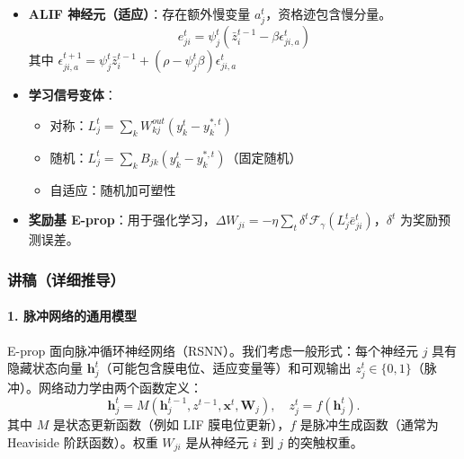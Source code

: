 \documentclass[journal,12pt,onecolumn]{IEEEtran}
\begin{document}
\begin{itemize}
\begin{equation}
        \end{equation}
    \item \textbf{ALIF 神经元（适应）}：存在额外慢变量 $a_j^t$，资格迹包含慢分量。
        \begin{equation}
            e_{ji}^t = \psi_j^t \left( \bar{z}_i^{t-1} - \beta \epsilon_{ji,a}^t \right)
        \end{equation}
        其中 $\epsilon_{ji,a}^{t+1} = \psi_j^t \bar{z}_i^{t-1} + (\rho - \psi_j^t\beta) \epsilon_{ji,a}^t$
    \item \textbf{学习信号变体}：
        \begin{itemize}
            \item 对称：$L_j^t = \sum_k W_{kj}^{out}(y_k^t - y_k^{*,t})$
            \item 随机：$L_j^t = \sum_k B_{jk}(y_k^t - y_k^{*,t})$（固定随机）
            \item 自适应：随机加可塑性
        \end{itemize}
    \item \textbf{奖励基 E-prop}：用于强化学习，$\Delta W_{ji} = -\eta \sum_t \delta^t \mathcal{F}_\gamma( L_j^t \bar{e}_{ji}^t )$，$\delta^t$ 为奖励预测误差。
\end{itemize}

\subsubsection*{讲稿（详细推导）}

\paragraph{1. 脉冲网络的通用模型}
E-prop 面向脉冲循环神经网络（RSNN）。我们考虑一般形式：每个神经元 $j$ 具有隐藏状态向量 $\mathbf{h}_j^t$（可能包含膜电位、适应变量等）和可观输出 $z_j^t \in \{0,1\}$（脉冲）。网络动力学由两个函数定义：
\[
\mathbf{h}_j^t = M(\mathbf{h}_j^{t-1}, z^{t-1}, \mathbf{x}^t, \mathbf{W}_j), \quad z_j^t = f(\mathbf{h}_j^t).
\]
其中 $M$ 是状态更新函数（例如 LIF 膜电位更新），$f$ 是脉冲生成函数（通常为 Heaviside 阶跃函数）。权重 $W_{ji}$ 是从神经元 $i$ 到 $j$ 的突触权重。
\end{document}
